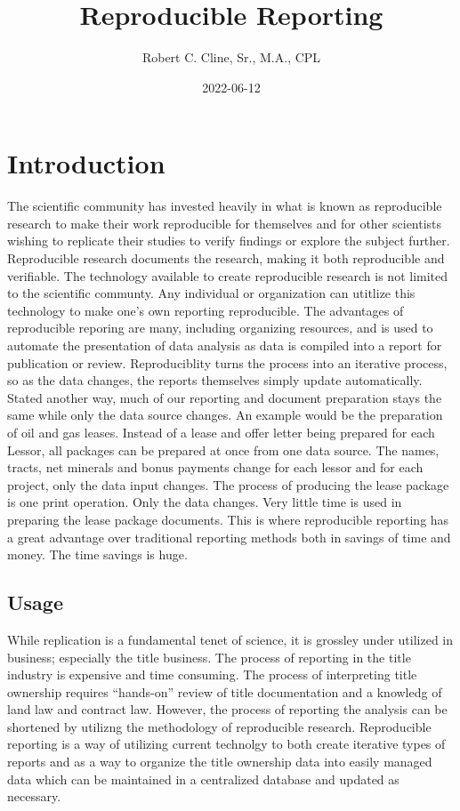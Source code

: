 \documentclass[
]{book}
\title{Reproducible Reporting}
\author{Robert C. Cline, Sr., M.A., CPL}
\date{2022-06-12}
\theoremstyle{definition}
\theoremstyle{definition}
\theoremstyle{definition}
\theoremstyle{definition}
\theoremstyle{remark}
\begin{document}
\maketitle

{
\setcounter{tocdepth}{1}
\tableofcontents
}
\hypertarget{introduction}{%
\chapter{Introduction}\label{introduction}}

The scientific community has invested heavily in what is known as reproducible research to make their work reproducible for themselves and for other scientists wishing to replicate their studies to verify findings or explore the subject further. Reproducible research documents the research, making it both reproducible and verifiable. The technology available to create reproducible research is not limited to the scientific communty. Any individual or organization can utitlize this technology to make one's own reporting reproducible. The advantages of reproducible reporing are many, including organizing resources, and is used to automate the presentation of data analysis as data is compiled into a report for publication or review. Reproduciblity turns the process into an iterative process, so as the data changes, the reports themselves simply update automatically. Stated another way, much of our reporting and document preparation stays the same while only the data source changes. An example would be the preparation of oil and gas leases. Instead of a lease and offer letter being prepared for each Lessor, all packages can be prepared at once from one data source. The names, tracts, net minerals and bonus payments change for each lessor and for each project, only the data input changes. The process of producing the lease package is one print operation. Only the data changes. Very little time is used in preparing the lease package documents. This is where reproducible reporting has a great advantage over traditional reporting methods both in savings of time and money. The time savings is huge.

\hypertarget{usage}{%
\section{Usage}\label{usage}}

While replication is a fundamental tenet of science, it is grossley under utilized in business; especially the title business. The process of reporting in the title industry is expensive and time consuming. The process of interpreting title ownership requires ``hands-on'' review of title documentation and a knowledg of land law and contract law. However, the process of reporting the analysis can be shortened by utilizng the methodology of reproducible research. Reproducible reporting is a way of utilizing current technolgy to both create iterative types of reports and as a way to organize the title ownership data into easily managed data which can be maintained in a centralized database and updated as necessary.
\end{document}
